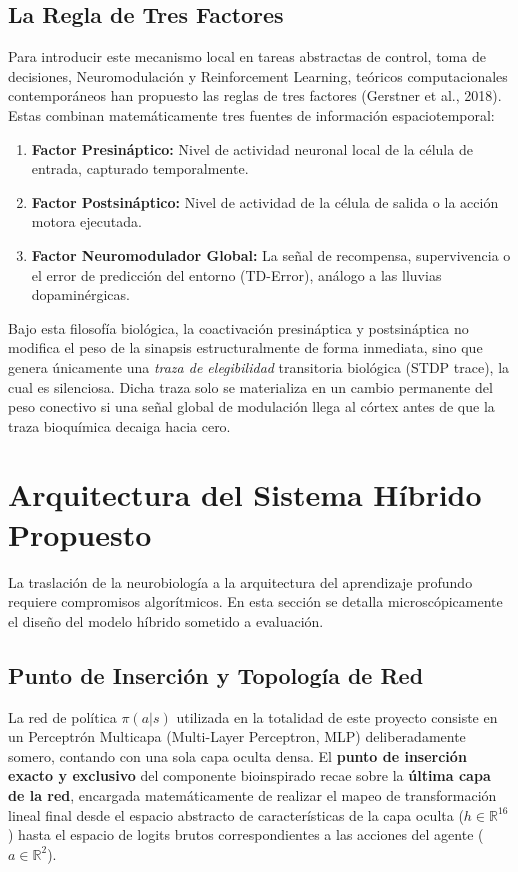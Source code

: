 \documentclass[a4paper,12pt,twocolumn]{article}
\begin{document}
\subsection{La Regla de Tres Factores}
Para introducir este mecanismo local en tareas abstractas de control, toma de decisiones, Neuromodulación y Reinforcement Learning, teóricos computacionales contemporáneos han propuesto las reglas de tres factores (Gerstner et al., 2018). Estas combinan matemáticamente tres fuentes de información espaciotemporal:
\begin{enumerate}
    \item \textbf{Factor Presináptico:} Nivel de actividad neuronal local de la célula de entrada, capturado temporalmente.
    \item \textbf{Factor Postsináptico:} Nivel de actividad de la célula de salida o la acción motora ejecutada.
    \item \textbf{Factor Neuromodulador Global:} La señal de recompensa, supervivencia o el error de predicción del entorno (TD-Error), análogo a las lluvias dopaminérgicas.
\end{enumerate}

Bajo esta filosofía biológica, la coactivación presináptica y postsináptica no modifica el peso de la sinapsis estructuralmente de forma inmediata, sino que genera únicamente una \textit{traza de elegibilidad} transitoria biológica (STDP trace), la cual es silenciosa. Dicha traza solo se materializa en un cambio permanente del peso conectivo si una señal global de modulación llega al córtex antes de que la traza bioquímica decaiga hacia cero.

\section{Arquitectura del Sistema Híbrido Propuesto}
La traslación de la neurobiología a la arquitectura del aprendizaje profundo requiere compromisos algorítmicos. En esta sección se detalla microscópicamente el diseño del modelo híbrido sometido a evaluación.

\subsection{Punto de Inserción y Topología de Red}
La red de política $\pi(a|s)$ utilizada en la totalidad de este proyecto consiste en un Perceptrón Multicapa (Multi-Layer Perceptron, MLP) deliberadamente somero, contando con una sola capa oculta densa. El \textbf{punto de inserción exacto y exclusivo} del componente bioinspirado recae sobre la \textbf{última capa de la red}, encargada matemáticamente de realizar el mapeo de transformación lineal final desde el espacio abstracto de características de la capa oculta ($h \in \mathbb{R}^{16}$) hasta el espacio de logits brutos correspondientes a las acciones del agente ($a \in \mathbb{R}^2$).
\end{document}
